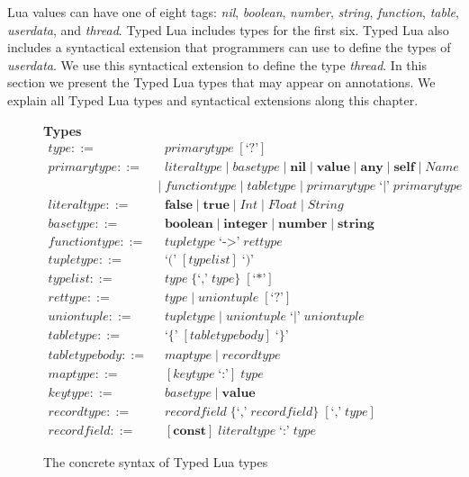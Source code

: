 Lua values can have one of eight tags:
\emph{nil}, \emph{boolean}, \emph{number}, \emph{string},
\emph{function}, \emph{table}, \emph{userdata}, and \emph{thread}.
Typed Lua includes types for the first six.
Typed Lua also includes a syntactical extension that programmers can use
to define the types of \emph{userdata}.
We use this syntactical extension to define the type \emph{thread}. 
In this section we present the Typed Lua types that may appear on annotations.
We explain all Typed Lua types and syntactical extensions along this chapter.

\begin{figure}[!ht]
\textbf{Types}\\
\dstart
\begin{align*}
\textit{type} ::= & \;\; \textit{primarytype} \; [\texttt{`?'}]\\
\textit{primarytype} ::= & \;\; \textit{literaltype} \; | \;
  \textit{basetype} \; | \;
  \textbf{nil} \; | \;
  \textbf{value} \; | \;
  \textbf{any} \; | \;
  \textbf{self} \; | \;
  \textit{Name}\\
& | \; \textit{functiontype} \; | \;
  \textit{tabletype} \; | \;
  \textit{primarytype} \; \texttt{`|'} \; \textit{primarytype}\\
\textit{literaltype} ::= & \;\; \textbf{false} \; | \;
  \textbf{true} \; | \;
  \textit{Int} \; | \;
  \textit{Float} \; | \;
  \textit{String}\\
\textit{basetype} ::= & \;\; \textbf{boolean} \; | \;
  \textbf{integer} \; | \;
  \textbf{number} \; | \;
  \textbf{string}\\
\textit{functiontype} ::= & \;\; \textit{tupletype} \; \texttt{`->'} \; \textit{rettype}\\
\textit{tupletype} ::= & \;\; \texttt{`('} \; [typelist] \; \texttt{`)'}\\
\textit{typelist} ::= & \;\; \textit{type} \; \{\texttt{`,'} \; \textit{type}\} \; [\texttt{`*'}]\\
\textit{rettype} ::= & \;\; \textit{type} \; | \;
  \textit{uniontuple} \; [\texttt{`?'}]\\
\textit{uniontuple} ::= & \;\; \textit{tupletype} \; | \;
  \textit{uniontuple} \; \texttt{`|'} \; \textit{uniontuple}\\
\textit{tabletype} ::= & \;\; \texttt{`\{'} \; [\textit{tabletypebody}] \; \texttt{`\}'}\\
\textit{tabletypebody} ::= & \;\; \textit{maptype} \; | \;
  \textit{recordtype}\\
\textit{maptype} ::= & \;\; [\textit{keytype} \; \texttt{`:'}] \; \textit{type}\\
\textit{keytype} ::= & \;\; \textit{basetype} \; | \;
  \textbf{value}\\
\textit{recordtype} ::= & \;\; \textit{recordfield} \; \{\texttt{`,'} \; \textit{recordfield}\} \; [\texttt{`,'} \; \textit{type}]\\
\textit{recordfield} ::= & \;\; [\textbf{const}] \; \textit{literaltype} \; \texttt{`:'} \; \textit{type}
\end{align*}
\dend
\caption{The concrete syntax of Typed Lua types}
\label{fig:types}
\end{figure}


